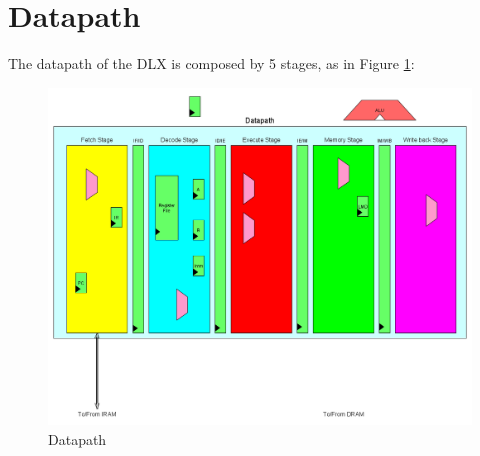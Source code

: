 \section{Datapath}
The datapath of the DLX is composed by 5 stages, as in Figure \ref{fig:dp}:
\begin{figure}[!htbp]
\centering
\captionsetup{justification=centering}
\includegraphics[scale=0.35,angle=0]{./chapters/figures/datapath.png}
\caption{Datapath \protect\footnotemark[1]}
\label{fig:dp}
\end{figure}
\newpage

